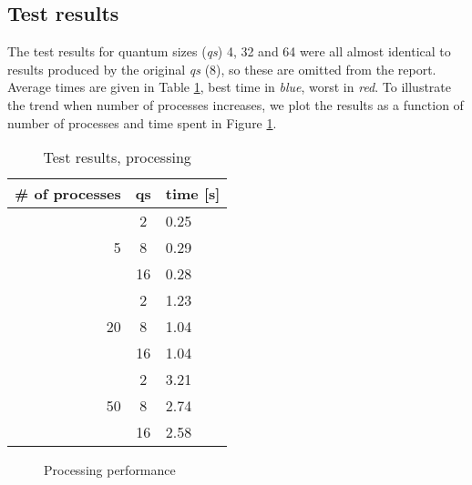 \documentclass[11pt]{article}
\begin{document}
\subsection{Test results}
The test results for quantum sizes (\emph{qs}) 4, 32 and 64 were all almost identical to results produced by the original \emph{qs} (8), so these are omitted from the report. Average times are given in Table \ref{tab:process_results}, best time in \emph{\color{MidnightBlue}blue}, worst in \emph{\color{BrickRed}red}. To illustrate the trend when number of processes increases, we plot the results as a function of number of processes and time spent in Figure \ref{fig:processing_performance}.

\begin{table}[h!]
	\begin{center}
		\begin{tabular}{ r | c | l }
		{\bf\# of processes} & {\bf qs } & {\bf time [s] }\\
		\hline
		  & 2 & {\color{MidnightBlue}0.25}\\
		5 & 8 & {\color{BrickRed}0.29}\\
		  & 16 & 0.28\\
		\hline
		   & 2 & {\color{BrickRed}1.23}\\
		20 & 8 & 1.04\\
		   & 16 & 1.04\\
		\hline
		   & 2 & {\color{BrickRed}3.21}\\
		50 & 8 & 2.74\\
		   & 16 & {\color{MidnightBlue}2.58}\\
		\end{tabular}
	  
	  \caption{Test results, processing}
	  \label{tab:process_results}
	\end{center}
\end{table}

\begin{figure}[H]
	\begin{center}
	\end{center}
	\caption{Processing performance}
  \label{fig:processing_performance}
\end{figure}
\end{document}
